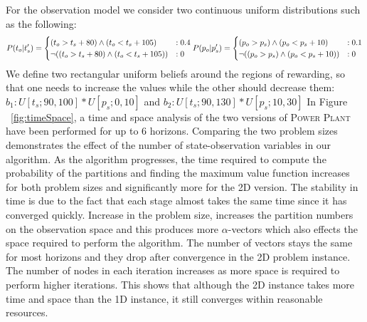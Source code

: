 \documentclass{article} %
\begin{document}
For the observation model we consider two continuous uniform distributions such as the following:  
{\footnotesize
\begin{align}
P(t_o|t_s') = 
\begin{cases}
 (t_o>t_s + 80) \wedge (t_o<t_s+ 105) &: 0.4 \\
 \neg( (t_o>t_s + 80) \wedge (t_o<t_s+ 105)) &: 0 \\
\end{cases}\nonumber
\hspace{0mm} 
P(p_o|p_s') = 
\begin{cases}
 (p_o>p_s) \wedge (p_o<p_s+10) &: 0.1 \\
 \neg( (p_o>p_s) \wedge (p_o<p_s+10)) &: 0 \\
\end{cases}\nonumber
\end{align}
}
We define two rectangular uniform beliefs around the regions of rewarding, so that one needs to increase the values while the other should decrease them: $b_1: U[t_s;90,100]*U[p_s;0,10]$ and $b_2: U[t_s;90,130]*U[p_s;10,30]$
In Figure ~\ref{fig:timeSpace}, a time and space analysis of
the two versions of \textsc{Power Plant} have been performed for up to 6 horizons. Comparing the two problem sizes demonstrates the effect of the number of state-observation variables in our algorithm. As the algorithm progresses, the time required to compute the probability of the partitions and finding the maximum value function increases for both problem sizes and significantly more for the 2D version. The stability in time is due to the fact that each stage almost takes the same time since it has converged quickly.%
Increase in the problem size, increases the partition numbers on the observation space and this produces more $\alpha$-vectors which also effects the space required to perform the algorithm. The number of vectors stays the same for most horizons and they drop after convergence in the 2D problem instance. The number of nodes in each iteration increases as more space is required to perform higher iterations. This shows that although the 2D instance takes more time and space than the 1D instance, it still converges within reasonable resources.
\end{document}
